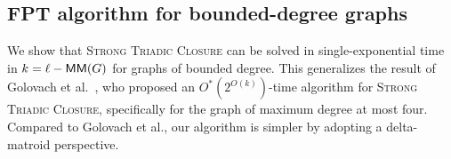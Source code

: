 \subsection{FPT algorithm for bounded-degree graphs}\label{ssec:STC_bounded_degree}

We show that \textsc{Strong Triadic Closure} can be solved in single-exponential time in $k = \ell - \mathsf{MM}(G)$ for graphs of bounded degree.
This generalizes the result of
Golovach et al.~\cite{GolovachHKLP20}, who proposed an $O^*(2^{O(k)})$-time algorithm  for \textsc{Strong Triadic Closure}, specifically for the graph of maximum degree at most four.
Compared to Golovach et al., our algorithm is simpler by adopting a delta-matroid perspective.

\tcamdelta*
